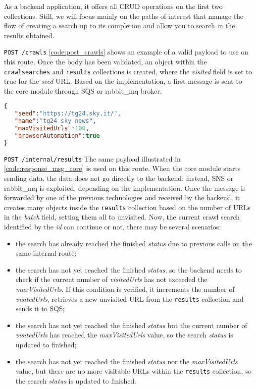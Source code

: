 \documentclass[../thesis.tex]{subfiles}
\begin{document}
As a backend application, it offers all \acrshort{CRUD} operations on the first two collections. Still, we will focus mainly on the paths of interest that manage the flow of creating a search up to its completion and allow you to search in the results obtained.

\texttt{POST /crawls} \autoref{code:post_crawls} shows an example of a valid payload to use on this route. Once the body has been validated, an object within the \texttt{crawlsearches} and \texttt{results} collections is created, where the \textit{visited} field is set to true for the \textit{seed} \acrshort{URL}. Based on the implementation, a first message is sent to the core module through \acrshort{SQS} or \gls{rabbit_mq} broker.

\begin{lstlisting}[language=json, captionpos=b, caption={[Sample of new search creation payload]Example of a valid payload message to create a new search.}, label={code:post_crawls}]
{
   "seed":"https://tg24.sky.it/",
   "name":"tg24 sky news",
   "maxVisitedUrls":100,
   "browserAutomation":true
}
\end{lstlisting}

\texttt{POST /internal/results} The same payload illustrated in \autoref{code:response_msg_core} is used on this route. When the core module starts sending data, the data does not go directly to the backend; instead, \acrshort{SNS} or \gls{rabbit_mq} is exploited, depending on the implementation. Once the message is forwarded by one of the previous technologies and received by the backend, it creates many objects inside the \texttt{results} collection based on the number of \acrshort{URL}s in the \textit{batch} field, setting them all to unvisited. Now, the current crawl search identified by the \textit{id} can continue or not, there may be several scenarios:

\begin{itemize}
    \item the search has already reached the finished \textit{status} due to previous calls on the same internal route;
    \item the search has not yet reached the finished \textit{status}, so the backend needs to check if the current number of \textit{visitedUrls} has not exceeded the \textit{maxVisitedUrls}. If this condition is verified, it increments the number of \textit{visitedUrls}, retrieves a new unvisited \acrshort{URL} from the \texttt{results} collection and sends it to \acrshort{SQS};
    \item the search has not yet reached the finished \textit{status} but the current number of \textit{visitedUrls} has reached the \textit{maxVisitedUrls} value, so the search \textit{status} is updated to finished;
    \item the search has not yet reached the finished \textit{status} nor the \textit{maxVisitedUrls} value, but there are no more visitable \acrshort{URL}s within the \texttt{results} collection, so the search \textit{status} is updated to finished.
\end{itemize}
\end{document}
